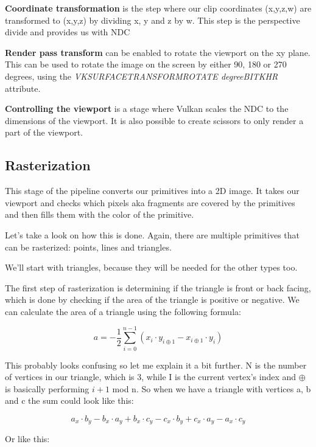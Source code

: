 \documentclass[12pt]{report} \usepackage{preamble}
\begin{document}
\textbf{Coordinate transformation} is the step where our clip coordinates (x,y,z,w)
are transformed to (x,y,z) by dividing x, y and z by w.
This step is the perspective divide and provides us with
\ac{NDC} \cite{vertex-post-processing}

\textbf{Render pass transform} can be enabled to rotate the viewport on the xy plane.
This can be used to rotate the image on the screen by either 90, 180 or 270 degrees, using the
\textit{VK\textunderscore SURFACE\textunderscore TRANSFORM\textunderscore ROTATE\textunderscore
	{degree}\textunderscore BIT\textunderscore KHR} attribute. \cite{vertex-post-processing}

\textbf{Controlling the viewport} is a stage where Vulkan scales the \ac{NDC}
to the dimensions of the viewport. It is also possible to create
scissors to only render a part of the viewport.

\subsection{Rasterization}

This stage of the pipeline converts our primitives into a 2D image.
It takes our viewport and checks which pixels aka fragments are covered by the
primitives and then fills them with the color of the primitive.

Let's take a look on how this is done. Again, there are multiple primitives that can be rasterized:
points, lines and triangles.

We'll start with triangles, because they will be needed for the other types too.

The first step of rasterization is determining if the triangle is front or back facing,
which is done by checking if the area of the triangle is positive or negative.
We can calculate the area of a triangle using the following formula:

\[
	a = -\frac{1}{2} \sum_{i=0}^{n-1} (x_i \cdot y_{i\oplus 1} - x_{i\oplus 1} \cdot y_i)
\]

This probably looks confusing so let me explain it a bit further.
N is the number of vertices in our triangle, which is 3, while I is the current
vertex's index and \(\oplus\) is basically performing \( i+1\) mod n.
So when we have a triangle with vertices a, b and c the sum could look like this:

\[a_x \cdot b_y - b_x \cdot a_y + b_x \cdot c_y - c_x \cdot b_y + c_x \cdot a_y - a_x \cdot c_y\]

Or like this:
\end{document}
